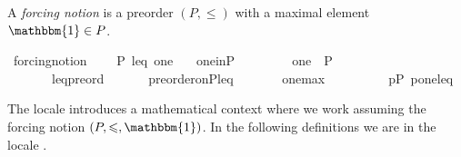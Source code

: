 \begin{definition}
  A \emph{forcing notion} is a preorder $(P,\leqslant)$ with a maximal element $\mathbbm{1} \in P$.
  \begin{isabelle}
\isamarkupfalse%
\ forcing{\isacharunderscore}notion\ {\isacharequal}\isanewline
\ \ \ P\ leq\ one\isanewline
\ \ \ one{\isacharunderscore}in{\isacharunderscore}P{\isacharcolon}\ \ \ \ \ \ \ \ \ {\isachardoublequoteopen}one\ {\isasymin}\ P{\isachardoublequoteclose}\isanewline
\ \ \ \ \ \ \ leq{\isacharunderscore}preord{\isacharcolon}\ \ \ \ \ \ \ {\isachardoublequoteopen}preorder{\isacharunderscore}on{\isacharparenleft}P{\isacharcomma}leq{\isacharparenright}{\isachardoublequoteclose}\isanewline
\ \ \ \ \ \ \ one{\isacharunderscore}max{\isacharcolon}\ \ \ \ \ \ \ \ \ \ {\isachardoublequoteopen}{\isasymforall}p{\isasymin}P{\isachardot}\ {\isasymlangle}p{\isacharcomma}one{\isasymrangle}{\isasymin}leq{\isachardoublequoteclose}
\end{isabelle}
\end{definition}
\noindent The locale   introduces a mathematical
context where we work assuming the forcing notion
$(P,\leqslant, \mathbbm{1})$. 
In the following definitions we are in
the locale .

